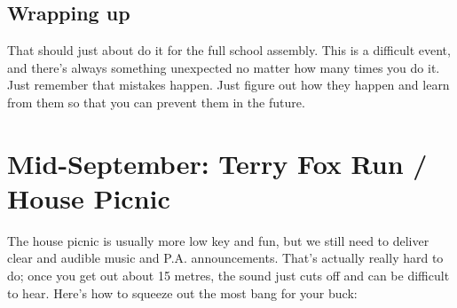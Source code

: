 \documentclass[letterpaper,10pt,oneside,headsepline]{scrreprt}
\begin{document}
\subsection{Wrapping up}
That should just about do it for the full school assembly. This is a difficult event, and there's always something unexpected no matter how many times you do it. Just remember that mistakes happen. Just figure out how they happen and learn from them so that you can prevent them in the future.

\section{Mid-September: Terry Fox Run / House Picnic}
The house picnic is usually more low key and fun, but we still need to deliver clear and audible music and P.A. announcements. That's actually really hard to do; once you get out about 15 metres, the sound just cuts off and can be difficult to hear. Here's how to squeeze out the most bang for your buck:
\end{document}
